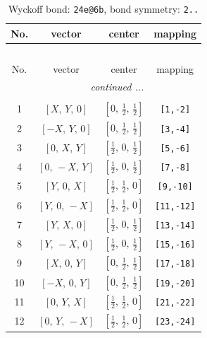 \documentclass[fleqn,8pt]{jsarticle}
\begin{document}
\renewcommand{\arraystretch}{1.2}
\begin{longtable}{cccc}
\caption{Wyckoff bond: {\tt 24e@6b}, bond symmetry: {\tt 2..}}
 \\
 \hline \hline
No. & vector & center & mapping \\ \hline \endfirsthead

\multicolumn{3}{l}{\tablename\ \thetable{}} \\
 \hline \hline
No. & vector & center & mapping \\ \hline \endhead

 \hline \hline
\multicolumn{3}{r}{\footnotesize\it continued ...} \\ \endfoot

 \hline \hline
\multicolumn{3}{r}{} \\ \endlastfoot

1 & $\left[ X,\, Y,\, 0 \right]$ & $\left[ 0,\, \frac{1}{2},\, \frac{1}{2} \right]$ & {\tt [1,-2]} \\ \hline
2 & $\left[ - X,\, Y,\, 0 \right]$ & $\left[ 0,\, \frac{1}{2},\, \frac{1}{2} \right]$ & {\tt [3,-4]} \\ \hline
3 & $\left[ 0,\, X,\, Y \right]$ & $\left[ \frac{1}{2},\, 0,\, \frac{1}{2} \right]$ & {\tt [5,-6]} \\ \hline
4 & $\left[ 0,\, - X,\, Y \right]$ & $\left[ \frac{1}{2},\, 0,\, \frac{1}{2} \right]$ & {\tt [7,-8]} \\ \hline
5 & $\left[ Y,\, 0,\, X \right]$ & $\left[ \frac{1}{2},\, \frac{1}{2},\, 0 \right]$ & {\tt [9,-10]} \\ \hline
6 & $\left[ Y,\, 0,\, - X \right]$ & $\left[ \frac{1}{2},\, \frac{1}{2},\, 0 \right]$ & {\tt [11,-12]} \\ \hline
7 & $\left[ Y,\, X,\, 0 \right]$ & $\left[ \frac{1}{2},\, 0,\, \frac{1}{2} \right]$ & {\tt [13,-14]} \\ \hline
8 & $\left[ Y,\, - X,\, 0 \right]$ & $\left[ \frac{1}{2},\, 0,\, \frac{1}{2} \right]$ & {\tt [15,-16]} \\ \hline
9 & $\left[ X,\, 0,\, Y \right]$ & $\left[ 0,\, \frac{1}{2},\, \frac{1}{2} \right]$ & {\tt [17,-18]} \\ \hline
10 & $\left[ - X,\, 0,\, Y \right]$ & $\left[ 0,\, \frac{1}{2},\, \frac{1}{2} \right]$ & {\tt [19,-20]} \\ \hline
11 & $\left[ 0,\, Y,\, X \right]$ & $\left[ \frac{1}{2},\, \frac{1}{2},\, 0 \right]$ & {\tt [21,-22]} \\ \hline
12 & $\left[ 0,\, Y,\, - X \right]$ & $\left[ \frac{1}{2},\, \frac{1}{2},\, 0 \right]$ & {\tt [23,-24]} \\
\end{longtable}
\end{document}
